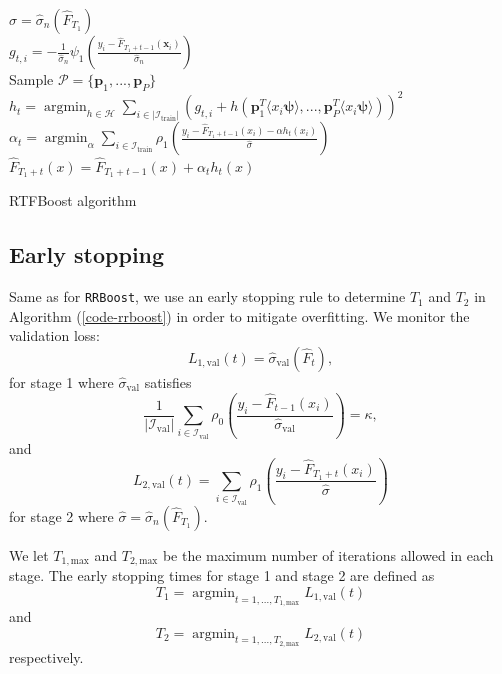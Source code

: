 \documentclass{article}
\let\oldref\ref
\renewcommand{\ref}[1]{(\oldref{#1})}
\DeclareMathOperator*{\argmin}{argmin}
\begin{document}
\begin{algorithm}[H]
{        }
      \hspace{1cm}  $\hat{\sigma} =  \hat{\sigma}_n(\hat{F}_{T_1})$ \\
     \Stageb{}
     \hspace{1cm}
     {
            \hspace{1cm} $g_{t,i} = - \frac{1}{\hat{\sigma}_n }
	    \psi_1 \left(\frac{y_{i}  - \hat{F}_{T_1 + t-1}(\mathbf{x}_{i})}{\hat{\sigma}_n} \right)$ \\
	        \hspace{1cm}  Sample $\mathcal{P} = \{\mathbf{p}_1,..., \mathbf{p}_P\}$ \\ 
                \hspace{1cm}  $h_t = \argmin_{h \in \mathcal{H}}  \sum_{i \in |\mathcal{I}_{\text{train}}|}  \left(g_{t,i} + h\left( \mathbf{p}_1^T\langle x_i \boldsymbol{\psi} \rangle, ..., \mathbf{p}_P^T\langle x_i \boldsymbol{\psi} \rangle \right) \right)^2$ \\
                  \hspace{1cm}  $\alpha_t = \argmin_{\alpha} \sum_{i \in \mathcal{I}_{\text{train}}} \rho_1 \left( \frac{y_i  - \hat{F}_{T_1 + t-1}(x_i)  - \alpha h_t\left( x_i \right)}{\hat{\sigma}} \right)$ \\
            \hspace{1cm} $\hat{F}_{T_1 + t}(x) = \hat{F}_{T_1 + t-1}(x) +   \alpha_t h_t(x)$ 
        }
          \caption{RTFBoost algorithm}
            \label{code-rrboost}
\end{algorithm}

\subsection{Early stopping}
Same as for \texttt{RRBoost}, we use an early stopping rule to determine $T_1$ and $T_2$ in Algorithm \ref{code-rrboost} in order to mitigate overfitting. We monitor the validation loss: 
$$L_{1,\text{val}}(t) = \hat{\sigma}_{\text{val}}(\hat{F}_t),$$
for stage 1 where $\hat{\sigma}_{\text{val}}$ satisfies 
 $$\frac{1}{| \mathcal{I}_{\text{val}}|}\sum_{i \in \mathcal{I}_{\text{val}}} \rho_0 \left( \frac{y_i - \hat{F}_{t-1}(x_i)}{\hat{\sigma}_{\text{val}}}\right) = \kappa,$$
 and
$$L_{2,\text{val}}(t) = \sum_{i\in \mathcal{I}_{\text{val}}} \rho_1 \left( \frac{y_i  - \hat{F}_{T_1 + t}(x_i)}{\hat{\sigma}}\right)$$
for stage 2 where 
$\hat{\sigma} =  \hat{\sigma}_n(\hat{F}_{T_1})$. 

We let $T_{1,\text{max}}$  and $T_{2,\text{max}}$ be the maximum number of iterations allowed in each stage. The early stopping times for stage 1 and stage 2 are defined as 
$$T_1 = \argmin_{t=1,..., T_{1,\text{max}}} L_{1,\text{val}}(t)$$
and $$T_2 = \argmin_{t=1,..., T_{2,\text{max}}} L_{2,\text{val}}(t)$$
respectively. 
\end{document}
